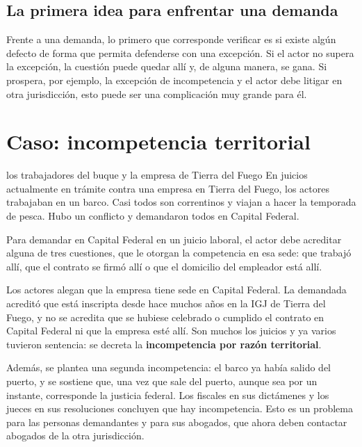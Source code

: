 \documentclass[12pt,oneside]{book}
\begin{document}
\subsection{La primera idea para enfrentar una demanda}

Frente a una demanda, lo primero que corresponde verificar es si existe algún defecto de forma que permita defenderse con una excepción. Si el actor no supera la excepción, la cuestión puede quedar allí y, de alguna manera, se gana. Si prospera, por ejemplo, la excepción de incompetencia y el actor debe litigar en otra jurisdicción, esto puede ser una complicación muy grande para él.

\section{Caso: incompetencia territorial}

\begin{example}{los trabajadores del buque y la empresa de Tierra del Fuego}
En juicios actualmente en trámite contra una empresa en Tierra del Fuego, los actores trabajaban en un barco. Casi todos son correntinos y viajan a hacer la temporada de pesca. Hubo un conflicto y demandaron todos en Capital Federal.

Para demandar en Capital Federal en un juicio laboral, el actor debe acreditar alguna de tres cuestiones, que le otorgan la competencia en esa sede: que trabajó allí, que el contrato se firmó allí o que el domicilio del empleador está allí.

Los actores alegan que la empresa tiene sede en Capital Federal. La demandada acreditó que está inscripta desde hace muchos años en la IGJ de Tierra del Fuego, y no se acredita que se hubiese celebrado o cumplido el contrato en Capital Federal ni que la empresa esté allí. Son muchos los juicios y ya varios tuvieron sentencia: se decreta la \textbf{incompetencia por razón territorial}.

Además, se plantea una segunda incompetencia: el barco ya había salido del puerto, y se sostiene que, una vez que sale del puerto, aunque sea por un instante, corresponde la justicia federal. Los fiscales en sus dictámenes y los jueces en sus resoluciones concluyen que hay incompetencia. Esto es un problema para las personas demandantes y para sus abogados, que ahora deben contactar abogados de la otra jurisdicción.
\end{example}
\end{document}
